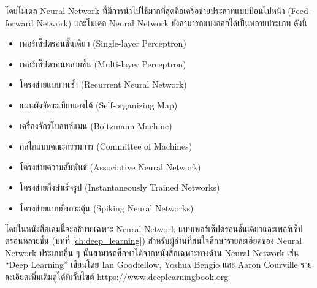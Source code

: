โดยโมเดล Neural Network ที่มีการนำไปใช้มากที่สุดคือเครือข่ายประสาทแบบป้อนไปหน้า (Feed-forward Network) และโมเดล Neural Network
ยังสามารถแบ่งออกได้เป็นหลายประเภท ดังนี้
%
\begin{itemize}[topsep=0pt,noitemsep]\setlength\itemsep{0.5em}
    \item เพอร์เซ็ปตรอนชั้นเดียว (Single-layer Perceptron)

    \item เพอร์เซ็ปตรอนหลายชั้น (Multi-layer Perceptron)

    \item โครงข่ายแบบวนซ้ำ (Recurrent Neural Network)

    \item แผนผังจัดระเบียบเองได้ (Self-organizing Map)

    \item เครื่องจักรโบลทซ์แมน (Boltzmann Machine)

    \item กลไกแบบคณะกรรมการ (Committee of Machines)

    \item โครงข่ายความสัมพันธ์ (Associative Neural Network)

    \item โครงข่ายกึ่งสำเร็จรูป (Instantaneously Trained Networks)

    \item โครงข่ายแบบยิงกระตุ้น (Spiking Neural Networks)
\end{itemize}

โดยในหนังสือเล่มนี้จะอธิบายเฉพาะ Neural Network แบบเพอร์เซ็ปตรอนชั้นเดียวและเพอร์เซ็ปตรอนหลายชั้น (บทที่ \ref{ch:deep_learning})
สำหรับผู้อ่านที่สนใจศึกษารายละเอียดของ Neural Network ประเภทอื่น ๆ นั้นสามารถศึกษาได้จากหนังสือเฉพาะทางด้าน Neural Network เช่น
\enquote{Deep Learning} เขียนโดย Ian Goodfellow, Yoshua Bengio และ Aaron Courville\autocite{Goodfellow-et-al-2016}
รายละเอียดเพิ่มเติมดูได้ที่เว็บไซต์ \url{https://www.deeplearningbook.org}
